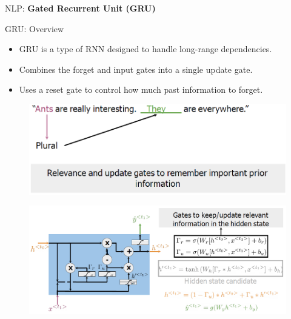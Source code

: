 \begin{frame}{}
    \LARGE NLP: \textbf{Gated Recurrent Unit (GRU)}
\end{frame}

\begin{frame}[allowframebreaks]{GRU: Overview}
    \begin{itemize}
        \item GRU is a type of RNN designed to handle long-range dependencies.
        \item Combines the forget and input gates into a single update gate.
        \item Uses a reset gate to control how much past information to forget.
    \end{itemize}

    \framebreak
    \begin{figure}
        \centering
        \includegraphics[width=\linewidth, height=0.9\textheight,keepaspectratio]{images/nlp/gru-1.png}
    \end{figure}

    \framebreak
    \begin{figure}
        \centering
        \includegraphics[width=\linewidth, height=0.9\textheight,keepaspectratio]{images/nlp/gru-2.png}
    \end{figure}
\end{frame}


